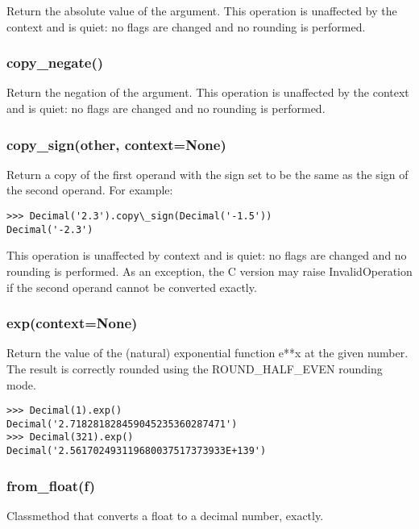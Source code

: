 Return the absolute value of the argument. This operation is unaffected by the context and is quiet: no flags are changed and no rounding is performed.


\subsubsection{copy\_negate()}

Return the negation of the argument. This operation is unaffected by the context and is quiet: no flags are changed and no rounding is performed.


\subsubsection{copy\_sign(other, context=None)}

Return a copy of the first operand with the sign set to be the same as the sign of the second operand. For example:

\begin{lstlisting}
>>> Decimal('2.3').copy\_sign(Decimal('-1.5'))
Decimal('-2.3')
\end{lstlisting}

This operation is unaffected by context and is quiet: no flags are changed and no rounding is performed. As an exception, the C version may raise InvalidOperation if the second operand cannot be converted exactly.


\subsubsection{exp(context=None)}

Return the value of the (natural) exponential function e**x at the given number. The result is correctly rounded using the ROUND\_HALF\_EVEN rounding mode.

\begin{lstlisting}
>>> Decimal(1).exp()
Decimal('2.718281828459045235360287471')
>>> Decimal(321).exp()
Decimal('2.561702493119680037517373933E+139')
\end{lstlisting}

\subsubsection{from\_float(f)}

Classmethod that converts a float to a decimal number, exactly.

